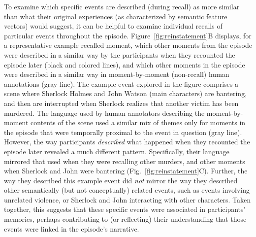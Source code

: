 \documentclass{article}
\begin{document}
To examine which specific events are described (during recall) as more similar than what their original experiences (as characterized by semantic feature vectors) would suggest, it can be helpful to examine individual recalls of particular events throughout the episode.  Figure~\ref{fig:reinstatement}B displays, for a representative example recalled moment, which other moments from the episode were described in a similar way by the participants when they recounted the episode later (black and colored lines), and which other moments in the episode were described in a similar way in moment-by-moment (non-recall) human annotations (gray line).  The example event explored in the figure comprises a scene where Sherlock Holmes and John Watson (main characters) are bantering, and then are interrupted when Sherlock realizes that another victim has been murdered.  The language used by human annotators describing the moment-by-moment contents of the scene used a similar mix of themes only for moments in the episode that were temporally proximal to the event in question (gray line).  However, the way participants \textit{described} what happened when they recounted the episode later revealed a much different pattern.  Specifically, their language mirrored that used when they were recalling other murders, and other moments when Sherlock and John were bantering (Fig.~\ref{fig:reinstatement}C).  Further, the way they described this example event did \textit{not} mirror the way they described other semantically (but not conceptually) related events, such as events involving unrelated violence, or Sherlock and John interacting with other characters.  Taken together, this suggests that these specific events were associated in participants' memories, perhaps contributing to (or reflecting) their understanding that those events were linked in the episode's narrative.
\end{document}
